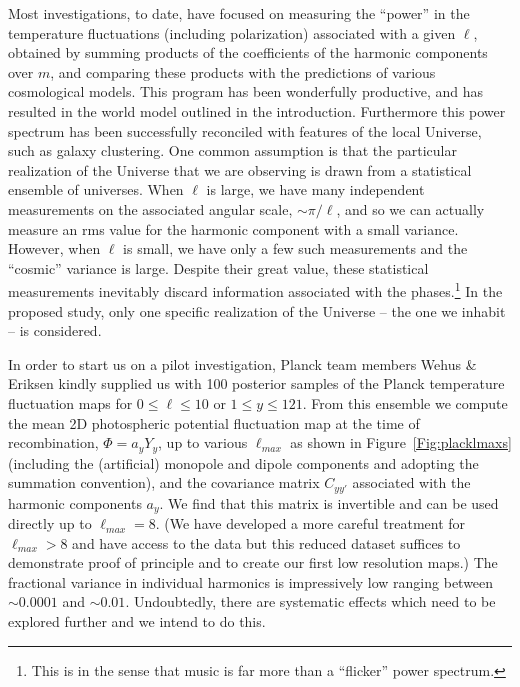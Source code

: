 \documentclass[psfig,12pt]{article}
\begin{document}
Most investigations, to date, have focused on measuring the ``power'' in the
temperature fluctuations (including polarization) associated with a
given $\ell$, obtained by summing products of the coefficients of the
harmonic components over $m$, and comparing these products with the predictions of
various cosmological models. This program has been wonderfully
productive, and has resulted in the world model outlined in the introduction.
Furthermore this power spectrum has been successfully reconciled with
features of the local Universe, such as galaxy clustering. One common
assumption is that the particular realization of the Universe that we
are observing is drawn from a statistical ensemble of universes. When
$\ell$ is large, we have many independent measurements on the associated
angular scale, $\sim\pi/\ell$, and so we can actually measure an rms value for
the harmonic component with a small variance. However, when $\ell$ is
small, we have only a few such measurements and the ``cosmic'' variance
is large. Despite their great value, these statistical measurements
inevitably discard information associated with the phases.\footnote{This is
in the sense that music is far more than a ``flicker'' power spectrum.}  In the proposed study, only one specific realization of the
Universe -- the one we inhabit --  is considered.

In order to start us on a pilot investigation, Planck team members Wehus \&
Eriksen kindly supplied us with 100 posterior samples of the Planck temperature
fluctuation maps for $0\le\ell\le10$ or $1\le y\le121$. From this
ensemble we compute the mean 2D photospheric potential
fluctuation map at the time of recombination, $\Phi=a_yY_y$, up to various $\ell_{max}$ as shown in Figure~\ref{Fig:placklmaxs} (including
the (artificial) monopole and dipole components and adopting the summation
convention), and the covariance matrix $C_{yy'}$ associated with the
harmonic components $a_y$. We find that this matrix is invertible and
can be used directly up to $\ell_{max}=8$. (We have developed a more careful treatment for $\ell_{max}>8$ and have access to the data but this reduced dataset suffices to demonstrate proof of principle and to create our first low resolution maps.) The fractional variance in individual harmonics
is impressively low ranging between $\sim0.0001$ and $\sim0.01$. Undoubtedly, there are
systematic effects which need to be explored further and we intend to do this.
\end{document}
